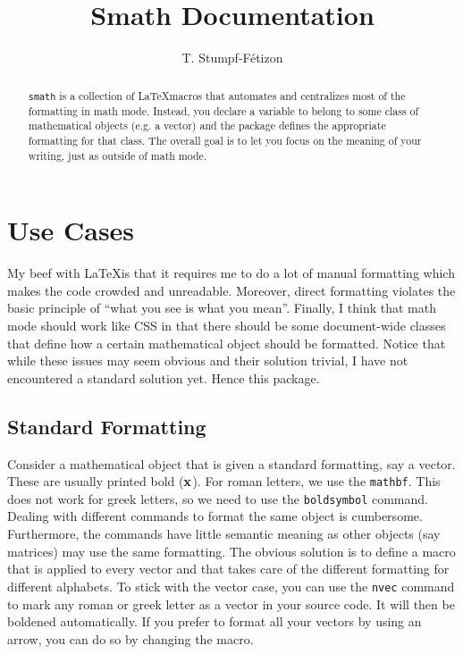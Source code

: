 \documentclass[a4paper,10pt]{scrartcl}
\title{Smath Documentation}
\author{T. Stumpf-Fétizon}
\begin{document}
\maketitle

\begin{abstract}
\texttt{smath} is a collection of \LaTeX macros that automates and centralizes most of the formatting in math mode. Instead, you declare a variable to belong to some class of mathematical objects (e.g. a vector) and the package defines the appropriate formatting for that class. The overall goal is to let you focus on the meaning of your writing, just as outside of math mode.
\end{abstract}

\section{Use Cases}
My beef with \LaTeX is that it requires me to do a lot of manual formatting which makes the code crowded and unreadable. Moreover, direct formatting violates the basic principle of ``what you see is what you mean''. Finally, I think that math mode should work like CSS in that there should be some document-wide classes that define how a certain mathematical object should be formatted. Notice that while these issues may seem obvious and their solution trivial, I have not encountered a standard solution yet. Hence this package.
\subsection{Standard Formatting}
Consider a mathematical object that is given a standard formatting, say a vector. These are usually printed bold ($\boldsymbol{\mathbf{x}}$). For roman letters, we use the \texttt{mathbf}. This does not work for greek letters, so we need to use the \texttt{boldsymbol} command. Dealing with different commands to format the same object is cumbersome. Furthermore, the commands have little semantic meaning as other objects (say matrices) may use the same formatting. The obvious solution is to define a macro that is applied to every vector and that takes care of the different formatting for different alphabets. To stick with the vector case, you can use the \texttt{nvec} command to mark any roman or greek letter as a vector in your source code. It will then be boldened automatically. If you prefer to format all your vectors by using an arrow, you can do so by changing the macro.
\end{document}
